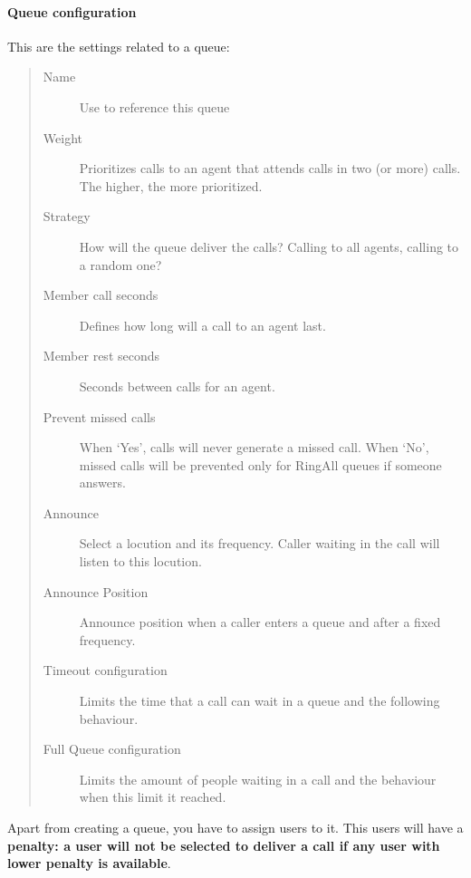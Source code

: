 \documentclass[letterpaper,10pt,spanish]{sphinxmanual}
\begin{document}
\paragraph{Queue configuration}
\label{administration_portal/client/vpbx/routing_endpoints/queues:queue-configuration}
This are the settings related to a queue:
\begin{quote}
\begin{description}
\item[{Name}] \leavevmode
Use to reference this queue

\item[{Weight}] \leavevmode
Prioritizes calls to an agent that attends calls in two (or more) calls. The
higher, the more prioritized.

\item[{Strategy}] \leavevmode
How will the queue deliver the calls? Calling to all agents, calling to a
random one?

\item[{Member call seconds}] \leavevmode
Defines how long will a call to an agent last.

\item[{Member rest seconds}] \leavevmode
Seconds between calls for an agent.

\item[{Prevent missed calls}] \leavevmode
When `Yes', calls will never generate a missed call. When `No', missed calls will be prevented only for RingAll
queues if someone answers.

\item[{Announce}] \leavevmode
Select a locution and its frequency. Caller waiting in the call will listen
to this locution.

\item[{Announce Position}] \leavevmode
Announce position when a caller enters a queue and after a fixed frequency.

\item[{Timeout configuration}] \leavevmode
Limits the time that a call can wait in a queue and the following behaviour.

\item[{Full Queue configuration}] \leavevmode
Limits the amount of people waiting in a call and the behaviour when this limit
it reached.

\end{description}
\end{quote}

Apart from creating a queue, you have to assign users to it. This users will have
a \textbf{penalty: a user will not be selected to deliver a call if any user with lower
penalty is available}.
\end{document}

